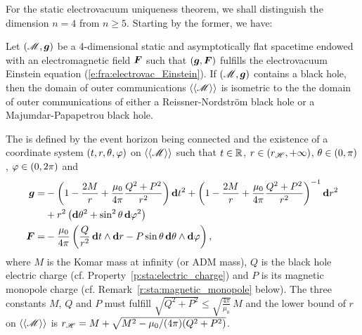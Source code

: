 For the static electrovacuum uniqueness theorem, we shall distinguish
the dimension $n=4$ from $n \geq 5$. Starting by the former, we have:

\begin{prop}[generalized Israel uniqueness theorem ($\bm{n = 4}$ electrovacuum)
\index{Israel uniqueness theorem!electrovacuum}]
\label{p:sta:Israel_uniq_electrovac_n4}
Let $(\mathscr{M},\bm{g})$ be a 4-dimensional static and asymptotically flat spacetime
endowed with an electromagnetic field $\bm{F}$
such that
$(\bm{g},\bm{F})$ fulfills the electrovacuum Einstein equation (\ref{e:fra:electrovac_Einstein}).
If $(\mathscr{M},\bm{g})$ contains a black hole, then the domain of outer communications $\langle\langle \mathscr{M}\rangle\rangle$ is isometric
to the the domain of outer communications of either a Reissner-Nordström black hole or a Majumdar-Papapetrou black hole.

The  is defined by the event horizon being connected and
the existence of a
coordinate system $(t,r,\theta,\varphi)$ on $\langle\langle \mathscr{M}\rangle\rangle$ such
that $t\in\mathbb{R}$, $r\in (r_{\mathscr{H}},+\infty)$, $\theta \in (0,\pi)$,
$\varphi\in (0, 2\pi)$ and
\begin{subequations}
\label{e:sta:ReiNor_n4}
\begin{align}
    \bm{g}  = & -\left( 1 - \frac{2 M}{r} + \frac{\mu_0}{4\pi} \frac{Q^2 + P^2}{r^2} \right) \mathbf{d} t^2
    + \left( 1 - \frac{2 M}{r} + \frac{\mu_0}{4\pi} \frac{Q^2 + P^2}{r^2} \right) ^{-1} \mathbf{d} r^2
    \nonumber \\
    &  + r^2 \left( \mathbf{d}\theta^2 + \sin^2\theta\, \mathbf{d}\varphi^2 \right) \label{e:sta:g_ReiNor_n4} \\
    \bm{F}  = & - \frac{\mu_0}{4\pi} \left( \frac{Q}{r^2}\,  \mathbf{d} t \wedge \mathbf{d} r
     - P \sin\theta \, \mathbf{d} \theta \wedge\mathbf{d} \varphi \right) , \label{e:sta:F_ReiNor_n4}
\end{align}
\end{subequations}
where $M$ is the Komar mass at infinity
(or ADM mass), $Q$ is the black hole electric charge (cf. Property~\ref{p:sta:electric_charge})
and
$P$ is its magnetic monopole charge (cf. Remark~\ref{r:sta:magnetic_monopole} below).
The three constants $M$, $Q$ and $P$ must fulfill
$\sqrt{Q^2 + P^2} \leq \sqrt{\frac{4\pi}{\mu_0}}\, M$
and the lower bound of $r$ on $\langle\langle \mathscr{M}\rangle\rangle$ is
 $r_{\mathscr{H}} = M + \sqrt{M^2 - \mu_0/(4\pi)(Q^2 + P^2)}$.


\end{prop}
